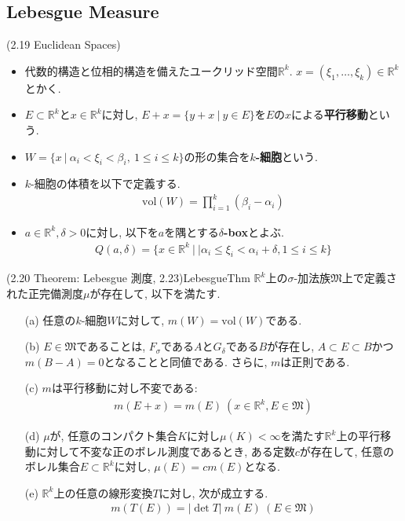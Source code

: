 \documentclass[a4paper]{jsarticle}
\begin{document}
\subsection{Lebesgue Measure}

\begin{defi}{(2.19 Euclidean Spaces)}{}
    \begin{itemize}
        \item 代数的構造と位相的構造を備えたユークリッド空間$\mathbb{R}^k$. $x=(\xi_1, \dots, \xi_k)\in \mathbb{R}^k$とかく.
        \item $E\subset \mathbb{R}^k$と$x\in \mathbb{R}^k$に対し, $E+x=\{y+x \ | \ y\in E \}$を$E$の$x$による{\bf 平行移動}という.
        \item $W=\{x \ | \ \alpha_i < \xi_i<\beta_i, \ 1\leq i\leq k \}$の形の集合を{\bf $k$-細胞}という.
        \item $k$-細胞の体積を以下で定義する.
        \begin{align*}
            \text{vol}(W) = \prod_{i=1}^k (\beta_i-\alpha_i)
        \end{align*}
        \item $a\in \mathbb{R}^k, \delta >0$に対し, 以下を$a$を隅とする{\bf $\delta$-box}とよぶ.
        \begin{align*}
            Q(a, \delta) = \{ x\in \mathbb{R}^k \ | \ | \alpha_i \leq \xi_i < \alpha_i+\delta, 1\leq i\leq k \}
        \end{align*}
    \end{itemize}
\end{defi}
\begin{thm}{(2.20 Theorem: Lebesgue 測度, 2.23)}{LebesgueThm}
    $\mathbb{R}^k$上の$\sigma$-加法族$\mathfrak{M}$上で定義された正完備測度$\mu$が存在して, 以下を満たす.
    \begin{enumerate}
        \item[(a)] 任意の$k$-細胞$W$に対して, $m(W) = \mathrm{vol}(W)$である.
        \item[(b)] $E\in \mathfrak{M}$であることは, $F_\sigma$である$A$と$G_\delta$である$B$が存在し, $A\subset E\subset B$かつ$m(B-A)=0$となることと同値である. さらに, $m$は正則である.
        \item[(c)] $m$は平行移動に対し不変である:
        \begin{align*}
            m(E+x) = m(E) \ (x\in \mathbb{R}^k, E\in \mathfrak{M})
        \end{align*}
        \item[(d)] $\mu$が, 任意のコンパクト集合$K$に対し$\mu(K)<\infty$を満たす$\mathbb{R}^k$上の平行移動に対して不変な正のボレル測度であるとき, ある定数$c$が存在して, 任意のボレル集合$E\subset \mathbb{R}^k$に対し, $\mu(E)=cm(E)$となる.
        \item[(e)] $\mathbb{R}^k$上の任意の線形変換$T$に対し, 次が成立する.
        \begin{align*}
            m(T(E))=|\det T|\ m(E) \ (E\in \mathfrak{M})
        \end{align*}
    \end{enumerate}
\end{thm}
\end{document}
